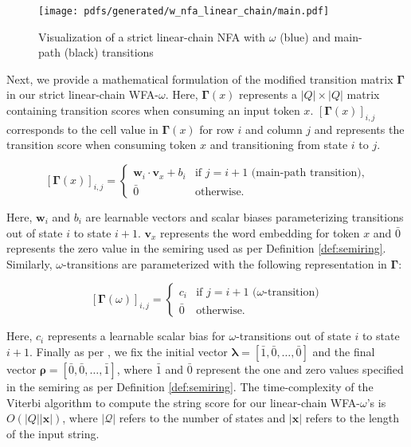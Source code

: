 \begin{figure}[t!]
  \centering
  \texttt{[image: pdfs/generated/w\_nfa\_linear\_chain/main.pdf]}
  \caption{Visualization of a strict linear-chain NFA with
    $\omega$ (blue) and main-path (black) transitions}
  \label{fig:omega_fa}
\end{figure}

Next, we provide a mathematical formulation of the modified transition matrix
$\bm{\Gamma}$ in our strict linear-chain WFA-$\omega$. Here, $\bm{\Gamma}(x)$ represents a
$|Q|\times|Q|$ matrix containing transition scores when consuming an input token
$x$. $[\bm{\Gamma}(x)]_{i,j}$ corresponds to the cell value in $\bm{\Gamma}(x)$ for row
$i$ and column $j$ and represents the transition score when consuming token $x$
and transitioning from state $i$ to $j$.

\begin{equation}
  \label{eq:spp_transition_matrix_main}
  [\bm{\Gamma}(x)]_{i,j} =
  \begin{cases}
    \bm{w}_i \cdot \bm{v}_x + b_i  & \text{if } j = i + 1 \text{ (main-path transition),} \\
    \bar{0} & \text{otherwise.}
  \end{cases}
\end{equation}

Here, $\bm{w}_i$ and $b_i$ are learnable vectors and scalar biases
parameterizing transitions out of state $i$ to state $i+1$. $\bm{v}_x$
represents the word embedding for token $x$ and $\bar{0}$ represents the zero
value in the semiring used as per Definition \ref{def:semiring}. Similarly,
$\omega$-transitions are parameterized with the following representation in
$\bm{\Gamma}$:

\begin{equation}
  \label{eq:spp_transition_matrix_omega}
  [\bm{\Gamma}(\omega)]_{i,j} =
  \begin{cases}
    c_i  & \text{if } j = i + 1 \text{ ($\omega$-transition)} \\
    \bar{0} & \text{otherwise.}
  \end{cases}
\end{equation}

Here, $c_i$ represents a learnable scalar bias for $\omega$-transitions out of
state $i$ to state $i+1$. Finally as per \citet{schwartz2018sopa}, we fix the
initial vector $\bm{\lambda} = [\bar{1}, \bar{0}, \ldots, \bar{0}]$ and the final
vector $\bm{\rho} = [\bar{0}, \bar{0}, \ldots, \bar{1}]$, where $\bar{1}$ and
$\bar{0}$ represent the one and zero values specified in the semiring as per
Definition \ref{def:semiring}. The time-complexity of the Viterbi algorithm to
compute the string score for our linear-chain WFA-$\omega$'s is
$O(|Q||\bm{x}|)$, where $|\mathcal{Q}|$ refers to the number of states and
$|\bm{x}|$ refers to the length of the input string.

